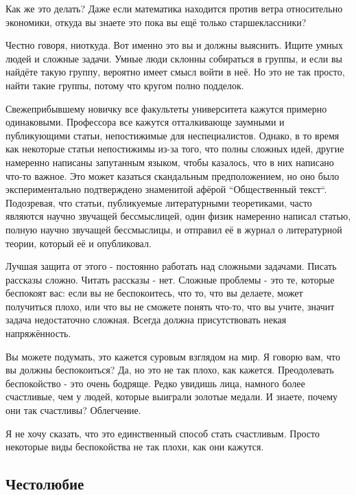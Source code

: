 \documentclass[ebook,12pt,oneside,openany]{memoir}
\begin{document}
Как же это делать? Даже если математика находится против ветра
относительно экономики, откуда вы знаете это пока вы ещё только
старшеклассники? \newline

Честно говоря, ниоткуда. Вот именно это вы и должны выяснить. Ищите
умных людей и сложные задачи. Умные люди склонны собираться в группы,
и если вы найдёте такую группу, вероятно имеет смысл войти в неё. Но
это не так просто, найти такие группы, потому что кругом полно
подделок. \newline

Свежеприбывшему новичку все факультеты университета кажутся примерно
одинаковыми. Профессора все кажутся отталкивающе заумными и
публикующими статьи, непостижимые для неспециалистов. Однако, в то
время как некоторые статьи непостижимы из-за того, что полны сложных
идей, другие намеренно написаны запутанным языком, чтобы казалось, что
в них написано что-то важное. Это может казаться скандальным
предположением, но оно было экспериментально подтверждено знаменитой
афёрой ``Общественный текст``. Подозревая, что статьи, публикуемые
литературными теоретиками, часто являются научно звучащей
бессмыслицей, один физик намеренно написал статью, полную научно
звучащей бессмыслицы, и отправил её в журнал о литературной теории,
который её и опубликовал. \newline

Лучшая защита от этого - постоянно работать над сложными задачами.
Писать рассказы сложно. Читать рассказы - нет. Сложные проблемы - это
те, которые беспокоят вас: если вы не беспокоитесь, что то, что вы
делаете, может получиться плохо, или что вы не сможете понять что-то,
что вы учите, значит задача недостаточно сложная. Всегда должна
присутствовать некая напряжённость. \newline

Вы можете подумать, это кажется суровым взглядом на мир. Я говорю вам,
что вы должны беспокоиться? Да, но это не так плохо, как кажется.
Преодолевать беспокойство - это очень бодряще. Редко увидишь лица,
намного более счастливые, чем у людей, которые выиграли золотые
медали. И знаете, почему они так счастливы? Облегчение. \newline

Я не хочу сказать, что это единственный способ стать счастливым.
Просто некоторые виды беспокойства не так плохи, как они кажутся. \newline

\subsection{Честолюбие}
\end{document}
